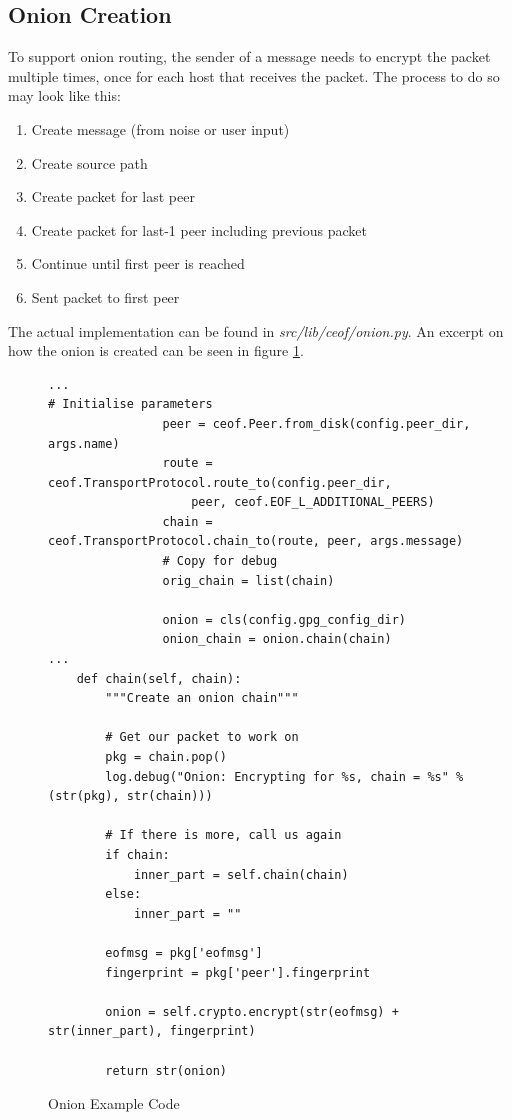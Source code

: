 \subsection{Onion Creation}
To support onion routing, the sender of a message needs to encrypt the packet
multiple times, once for each host that receives the packet. 
The process to do so may look like this:
\begin{enumerate}
\item Create message (from noise or user input)
\item Create source path
\item Create packet for last peer
\item Create packet for last-1 peer including previous packet
\item Continue until first peer is reached
\item Sent packet to first peer 
\end{enumerate}
The actual implementation can be found in \textit{src/lib/ceof/onion.py}.
An excerpt on how the onion is created can be seen in figure \ref{onionexample}.
\begin{figure}[htbp]
\caption{Onion Example Code}
\label{onionexample}
\begin{verbatim}
...
# Initialise parameters
                peer = ceof.Peer.from_disk(config.peer_dir, args.name)
                route = ceof.TransportProtocol.route_to(config.peer_dir, 
                    peer, ceof.EOF_L_ADDITIONAL_PEERS)
                chain = ceof.TransportProtocol.chain_to(route, peer, args.message)
                # Copy for debug
                orig_chain = list(chain)

                onion = cls(config.gpg_config_dir)
                onion_chain = onion.chain(chain)
...
    def chain(self, chain):
        """Create an onion chain"""

        # Get our packet to work on
        pkg = chain.pop()
        log.debug("Onion: Encrypting for %s, chain = %s" % (str(pkg), str(chain)))

        # If there is more, call us again
        if chain:
            inner_part = self.chain(chain)
        else:   
            inner_part = ""

        eofmsg = pkg['eofmsg']
        fingerprint = pkg['peer'].fingerprint

        onion = self.crypto.encrypt(str(eofmsg) + str(inner_part), fingerprint)

        return str(onion)
\end{verbatim}
\end{figure}
